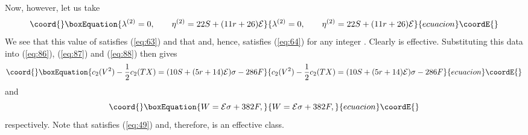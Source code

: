 \documentclass[a4paper,12pt]{article}
\numberwithin{equation}{section}
\theoremstyle{plain}
\begin{document}
Now, however, let us take
%
\begin{equation}\coord{}\boxEquation{
\lambda^{(2)}=0, \qquad \eta^{(2)}=22S+(11r+26){\cal{E}}
\label{eq:104}
}{
\lambda^{(2)}=0, \qquad \eta^{(2)}=22S+(11r+26){\cal{E}}
}{ecuacion}\coordE{}\end{equation}
%
We see that this value of \coordHE{} satisfies (\ref{eq:63}) and that
\coordHE{} and, hence, satisfies
(\ref{eq:64}) for any integer \coordHE{}. Clearly \coordHE{} is effective.
Substituting this data into (\ref{eq:86}), (\ref{eq:87}) and (\ref{eq:88}) 
then gives
%
\begin{equation}\coord{}\boxEquation{
c_{2}(V^{2})-\frac{1}{2}c_{2}(TX)=(10S+(5r+14){\cal{E}})\sigma-286F
\label{eq:105}
}{
c_{2}(V^{2})-\frac{1}{2}c_{2}(TX)=(10S+(5r+14){\cal{E}})\sigma-286F
}{ecuacion}\coordE{}\end{equation}
%
and
%
\begin{equation}\coord{}\boxEquation{
W={\cal{E}}\sigma+382F,
\label{eq:106}
}{
W={\cal{E}}\sigma+382F,
}{ecuacion}\coordE{}\end{equation}
%
respectively. Note that \coordHE{} satisfies (\ref{eq:49}) and, therefore, is an
effective class.
\end{document}
